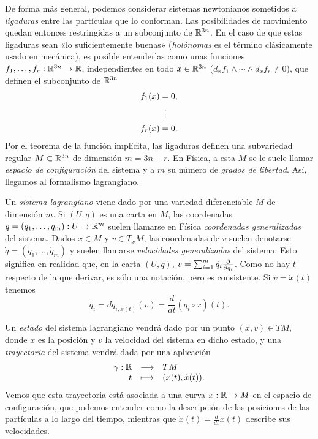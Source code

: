 De forma más general, podemos considerar sistemas newtonianos sometidos a \emph{ligaduras} entre las partículas que lo conforman. Las posibilidades de movimiento quedan entonces restringidas a un subconjunto de $\mathbb{R}^{3n}$. En el caso de que estas ligaduras sean «lo suficientemente buenas» (\emph{holónomas} es el término clásicamente usado en mecánica), es posible entenderlas como unas funciones $f_1,\dots,f_r: \mathbb{R}^{3n} \rightarrow \mathbb{R}$, independientes en todo $x \in \mathbb{R}^{3n}$ ($d_xf_1 \wedge \cdots \wedge d_xf_r \neq 0$), que definen el subconjunto de $\mathbb{R}^{3n}$
\begin{align*}[left=\empheqlbrace]
    f_1(x)&=0, \\
    &\vdotswithin{=} \\
    f_r(x)&=0.
\end{align*}
Por el teorema de la función implícita, las ligaduras definen una subvariedad regular $M \subset \mathbb{R}^{3n}$ de dimensión $m=3n-r$. En Física, a esta $M$ se le suele llamar \emph{espacio de configuración} del sistema y a $m$ su número de \emph{grados de libertad}. Así, llegamos al formalismo lagrangiano. 

Un \emph{sistema lagrangiano} viene dado por una variedad diferenciable $M$ de dimensión $m$. Si $(U,q)$ es una carta en $M$, las coordenadas $q=(q_1,\dots,q_m): U \rightarrow \mathbb{R}^m$ suelen llamarse en Física \emph{coordenadas generalizadas} del sistema. Dados $x \in M$ y $v \in T_x M$, las coordenadas de $v$ suelen denotarse $\dot{q}=(\dot{q}_1,\dots,\dot{q}_m)$ y suelen llamarse \emph{velocidades generalizadas} del sistema. Esto significa en realidad que, en la carta $(U,q)$, $v=\sum_{i=1}^{m}\dot{q_i}\frac{\partial}{\partial q_i}$. Como no hay $t$ respecto de la que derivar, es sólo una notación, pero es consistente. Si $v=\dot{x}(t)$ tenemos
\begin{equation*}
  \dot{q_i} = dq_{i,x(t)}(v)=\frac{d}{dt}(q_i \circ x) (t).
\end{equation*}

Un \emph{estado} del sistema lagrangiano vendrá dado por un punto $(x,v) \in TM$, donde $x$ es la posición y $v$ la velocidad del sistema en dicho estado, y una \emph{trayectoria} del sistema vendrá dada por una aplicación
\begin{equation*}
  \begin{array}{rcl}
    \gamma: \mathbb{R} & \longrightarrow & TM \\
    t & \longmapsto & (x(t), \dot{x}(t)).
  \end{array}
\end{equation*}
Vemos que esta trayectoria está asociada a una curva $x:\mathbb{R} \rightarrow M$ en el espacio de configuración, que podemos entender como la descripción de las posiciones de las partículas a lo largo del tiempo, mientras que $\dot{x}(t)=\frac{d}{dt}x(t)$ describe sus velocidades.

